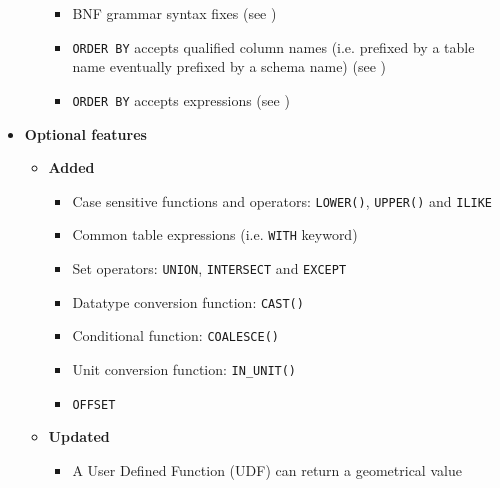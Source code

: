 \documentclass[11pt,a4paper]{ivoa}
\begin{document}
\begin{itemize}
\begin{itemize}
\begin{itemize}
                    \item BNF grammar syntax fixes
                          (see )
                    \item \verb:ORDER BY: accepts qualified column names (i.e.
                          prefixed by a table name eventually prefixed by a
                          schema name)
                          (see )
                    \item \verb:ORDER BY: accepts expressions
                    (see )
                \end{itemize}
        \end{itemize}
    \item \textbf{Optional features}
        \begin{itemize}
            \item \textbf{Added}
                \begin{itemize}
                    \item Case sensitive functions and operators:
                          \verb:LOWER():, \verb:UPPER(): and \verb:ILIKE:
                    \item Common table expressions (i.e. \verb:WITH: keyword)
                    \item Set operators: \verb:UNION:, \verb:INTERSECT: and
                          \verb:EXCEPT: 
                    \item Datatype conversion function: \verb:CAST():
                    \item Conditional function: \verb:COALESCE():
                    \item Unit conversion function: \verb:IN_UNIT():
                    \item \verb:OFFSET:
                \end{itemize}
            \item \textbf{Updated}
                \begin{itemize}
                    \item A User Defined Function (UDF) can return a geometrical
                          value 

\end{itemize}
\end{itemize}
\end{itemize}
\end{document}
